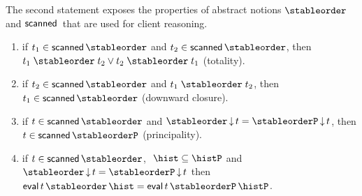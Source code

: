 The second statement exposes the properties of abstract notions
$\stableorder$ and $\scanned$ that are used for client reasoning.
%
\begin{invariant}\label{lem:scanned}%
%
\begin{enumerate}
 \item\label{lem:scan:total} if $ t_1 \in
   \scanned{\stableorder}$ and $t_2 \in \scanned{\stableorder}$, then
   $ t_1 \mathrel{\stableorder} t_2 \vee t_2 \mathrel{\stableorder}
   t_1 $ (totality).
   
 \item \label{lem:scan:wkn} if $ t_2 \in
   \scanned{\stableorder}$ and $ t_1 \mathrel{\stableorder} t_2$, then
   $t_1 \in \scanned{\stableorder}$ (downward closure).


\item \label{lem:scan:prefix} if $t \in
  \scanned{\stableorder}$ and $ \ideal{\stableorder}{t} =
  \ideal{\stableorderP}{t}$, then $t \in \scanned{\stableorderP}$ (principality).
  
\item \label{lem:scan:eval} if $t \in
  \scanned{\stableorder}$, $\ \hist \subseteq \histP$ and $
  \ideal{\stableorder}{t} = \ideal{\stableorderP}{t}$ then $ \eval\,
  t\, \stableorder\, \hist = \eval\, t\, \stableorderP\, \histP$. %
\end{enumerate}
\end{invariant}


